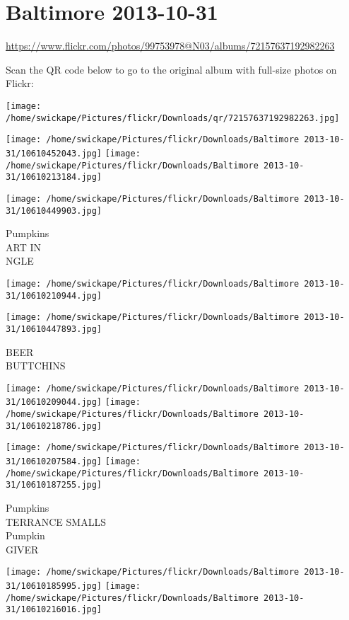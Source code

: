 \documentclass[10pt,letterpaper]{article}
\title{}
\author{}
\date{}
\begin{document}
\section*{Baltimore 2013-10-31}

\url{https://www.flickr.com/photos/99753978@N03/albums/72157637192982263}

Scan the QR code below to go to the original album with full-size photos on Flickr:

\texttt{[image: /home/swickape/Pictures/flickr/Downloads/qr/72157637192982263.jpg]}
\pagebreak

\texttt{[image: /home/swickape/Pictures/flickr/Downloads/Baltimore 2013-10-31/10610452043.jpg]}
\texttt{[image: /home/swickape/Pictures/flickr/Downloads/Baltimore 2013-10-31/10610213184.jpg]}

\texttt{[image: /home/swickape/Pictures/flickr/Downloads/Baltimore 2013-10-31/10610449903.jpg]}

Pumpkins\\
ART IN\\
NGLE
\pagebreak

\texttt{[image: /home/swickape/Pictures/flickr/Downloads/Baltimore 2013-10-31/10610210944.jpg]}

\vspace{0.25in}
\texttt{[image: /home/swickape/Pictures/flickr/Downloads/Baltimore 2013-10-31/10610447893.jpg]}

BEER\\
BUTTCHINS
\pagebreak

\texttt{[image: /home/swickape/Pictures/flickr/Downloads/Baltimore 2013-10-31/10610209044.jpg]}
\texttt{[image: /home/swickape/Pictures/flickr/Downloads/Baltimore 2013-10-31/10610218786.jpg]}

\texttt{[image: /home/swickape/Pictures/flickr/Downloads/Baltimore 2013-10-31/10610207584.jpg]}
\texttt{[image: /home/swickape/Pictures/flickr/Downloads/Baltimore 2013-10-31/10610187255.jpg]}

Pumpkins\\
TERRANCE SMALLS\\
Pumpkin\\
GIVER
\pagebreak

\texttt{[image: /home/swickape/Pictures/flickr/Downloads/Baltimore 2013-10-31/10610185995.jpg]}
\texttt{[image: /home/swickape/Pictures/flickr/Downloads/Baltimore 2013-10-31/10610216016.jpg]}
\end{document}
